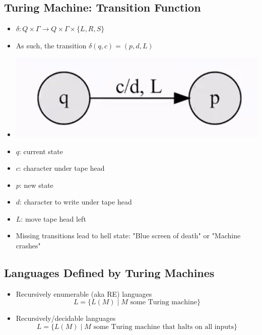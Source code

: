 \documentclass[12pt]{article}
\begin{document}
\subsection{Turing Machine: Transition Function}
\begin{itemize}
    \item $\delta: Q \times \Gamma \rightarrow Q \times \Gamma \times \{ L, R, S \}$
    \item As such, the transition $\delta(q, c) = (p, d, L)$
    \item[] \includegraphics[width=0.6\linewidth]{images/turing-transition-function.png}
    \item $q$: current state
    \item $c$: character under tape head
    \item $p$: new state
    \item $d$: character to write under tape head
    \item $L$: move tape head left
    \item Missing transitions lead to hell state: "Blue screen of death" or "Machine crashes"
\end{itemize}

\subsection{Languages Defined by Turing Machines}
\begin{itemize}
    \item Recursively enumerable (aka RE) languages
    \begin{equation}
        L = \{ L(M) \mid M \text{ some Turing machine} \}
    \end{equation}
    \item Recursively/decidable languages
    \begin{equation}
        L = \{ L(M) \mid M \text{ some Turing machine that halts on all inputs} \}
    \end{equation}
\end{itemize}
\end{document}
